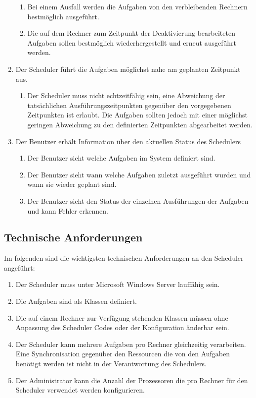 \begin{enumerate}
\begin{enumerate}
		\item Bei einem Ausfall werden die Aufgaben von den verbleibenden Rechnern bestmöglich ausgeführt.
		\item Die auf dem Rechner zum Zeitpunkt der Deaktivierung bearbeiteten Aufgaben sollen bestmöglich wiederhergestellt und erneut ausgeführt werden.
	\end{enumerate}
	\item Der Scheduler führt die Aufgaben möglichst nahe am geplanten Zeitpunkt aus.
	\begin{enumerate}
		\item Der Scheduler muss nicht echtzeitfähig sein, eine Abweichung der tatsächlichen Ausführungszeitpunkten gegenüber den vorgegebenen Zeitpunkten ist erlaubt. Die Aufgaben sollten jedoch mit einer möglichst geringen Abweichung zu den definierten Zeitpunkten abgearbeitet werden.
	\end{enumerate}
	\item Der Benutzer erhält Information über den aktuellen Status des Schedulers
	\begin{enumerate}
		\item Der Benutzer sieht welche Aufgaben im System definiert sind.
		\item Der Benutzer sieht wann welche Aufgaben zuletzt ausgeführt wurden und wann sie wieder geplant sind.
		\item Der Benutzer sieht den Status der einzelnen Ausführungen der Aufgaben und kann Fehler erkennen.
	\end{enumerate}
\end{enumerate}
\subsection{Technische Anforderungen}
Im folgenden sind die wichtigsten technischen Anforderungen an den Scheduler angeführt:
\begin{enumerate}
	\item Der Scheduler muss unter Microsoft Windows Server lauffähig sein.
	\item Die Aufgaben sind als Klassen definiert.
	\item Die auf einem Rechner zur Verfügung stehenden Klassen müssen ohne Anpassung des Scheduler Codes oder der Konfiguration änderbar sein.
	\item Der Scheduler kann mehrere Aufgaben pro Rechner gleichzeitig verarbeiten. Eine Synchronisation gegenüber den Ressourcen die von den Aufgaben benötigt werden ist nicht in der Verantwortung des Schedulers.
	\item Der Administrator kann die Anzahl der Prozessoren die pro Rechner für den Scheduler verwendet werden konfigurieren.
\end{enumerate}

\chapterend
